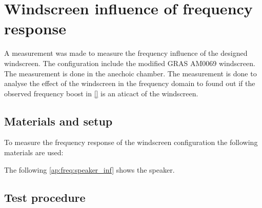 \chapter{Windscreen influence of frequency response}\label{app:wind_inf_res}
A measurement was made to measure the frequency influence of the designed windscreen. The configuration include the modified GRAS AM0069 windscreen. The measurement is done in the anechoic chamber. The measurement is done to analyse the effect of the windscreen in the frequency domain to found out if the observed frequency boost in \autoref{} is an aticact of the windscreen.





\section*{Materials and setup}
To measure the frequency response of the windscreen configuration the following materials are used:

\startequipment
{}
\stopequipment


The following \autoref{ap:freq:speaker_inf} shows the speaker.




\section*{Test procedure}


